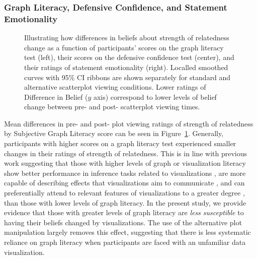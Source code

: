 \documentclass[manuscript,screen,review,anonymous]{acmart}
\begin{document}
\subsubsection{Graph Literacy, Defensive Confidence, and Statement
Emotionality}\label{sec-add-analyses-discussion}

\begin{figure}


\caption{\label{fig-add-analyses-plots}Illustrating how differences in
beliefs about strength of relatedness change as a function of
participants' scores on the graph literacy test (left), their scores on
the defensive confidence test (center), and their ratings of statement
emotionality (right). Localled smoothed curves with 95\% CI ribbons are
shown separately for standard and alternative scatterplot viewing
conditions. Lower ratings of Difference in Belief (\(y\) axis)
correspond to lower levels of belief change between pre- and post-
scatterplot viewing times.}

\end{figure}%

Mean differences in pre- and post- plot viewing ratings of strength of
relatedness by Subjective Graph Literacy score can be seen in
Figure~\ref{fig-add-analyses-plots}. Generally, participants with higher
scores on a graph literacy test experienced smaller changes in their
ratings of strength of relatedness. This is in line with previous work
suggesting that those with higher levels of graph or visualization
literacy show better performance in inference tasks related to
visualizations \citep{canham_2010}, are more capable of describing
effects that visualizations aim to communicate \citep{shah_2011}, and
can preferentially attend to relevant features of visualizations to a
greater degree \citep{okan_2016}, than those with lower levels of graph
literacy. In the present study, we provide evidence that those with
greater levels of graph literacy are \emph{less susceptible} to having
their beliefs changed by visualizations. The use of the alternative plot
manipulation largely removes this effect, suggesting that there is less
systematic reliance on graph literacy when participants are faced with
an unfamiliar data visualization.
\end{document}
